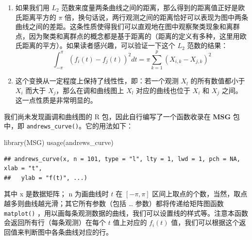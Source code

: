 \documentclass[
  b5paper,
  UTF8,twoside]{book}
\newenvironment{Shaded}{\begin{snugshade}}{\end{snugshade}}
\newcommand{\FunctionTok}[1]{\textcolor[rgb]{0.00,0.00,0.00}{#1}}
\newcommand{\NormalTok}[1]{#1}
\begin{document}
\begin{enumerate}
\def\labelenumi{\arabic{enumi}.}
\item
  如果我们用 \(L_{2}\) 范数来度量两条曲线之间的距离，那么得到的距离值正好是欧氏距离平方的 \(\pi\) 倍，换句话说，两行观测之间的距离恰好可以表现为图中两条曲线之间的差距。这条性质使得我们可以直观地在图中观察聚类现象和离群点，因为聚类和离群点的概念都是基于距离的（距离的定义有多种，这里用欧氏距离的平方）。如果读者感兴趣，可以验证一下这个 \(L_{2}\) 范数的结果：
  \[\int_{-\pi}^{\pi}\left(f_{i}(t)-f_{j}(t)\right)^{2}dt=\pi\sum_{k=1}^{p}\left(X_{i,k}-X_{j,k}\right)^{2}\]
\item
  这个变换从一定程度上保持了线性性，即：若一个观测 \(X_{l}\) 的所有数值都小于 \(X_{i}\) 而大于 \(X_{j}\)，那么在调和曲线图上 \(X_{l}\) 对应的曲线也位于 \(X_{i}\) 和 \(X_{j}\) 之间。这一点性质是非常明显的。
\end{enumerate}

我们尚未发现画调和曲线图的 R 包，因此自行编写了一个函数收录在 \textbf{MSG} 包 \citep{MSG} 中，即 \texttt{andrews\_curve()}。它的用法如下：

\begin{Shaded}
\begin{Highlighting}[]
\FunctionTok{library}\NormalTok{(MSG)}
\FunctionTok{usage}\NormalTok{(andrews\_curve)}
\end{Highlighting}
\end{Shaded}

\begin{verbatim}
## andrews_curve(x, n = 101, type = "l", lty = 1, lwd = 1, pch = NA, xlab = "t",
##   ylab = "f(t)", ...)
\end{verbatim}

其中 x 是数据矩阵； n 为画曲线时 \(t\) 在 \([-\pi,\pi]\) 区间上取点的个数，当然，取点越多则曲线越光滑；其它所有参数（包括 \ldots{} 参数）都将传递给矩阵图函数 \texttt{matplot()} ，用以画每条观测数据的曲线，我们可以设置线的样式等。注意本函数会返回所有行（每条观测）在每个 \(t\) 值上对应的 \(f_{i}(t)\) 值，我们可以根据这个返回值来判断图中各条曲线对应的行。
\end{document}
